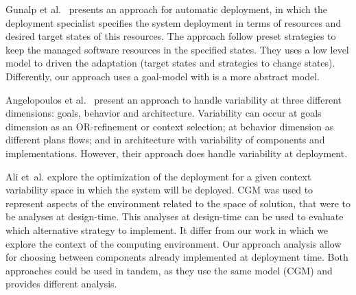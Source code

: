 Gunalp et al.~\citep{gunalp_rondo_2015} presents an approach for automatic deployment, in which the deployment specialist specifies the system deployment in terms of resources and desired target states of this resources. The approach follow preset strategies to keep the managed software resources in the specified states. They uses a low level model to driven the adaptation (target states and strategies to change states). Differently, our approach uses a goal-model with is a more abstract model.

Angelopoulos et al.~\cite{angelopoulos_capturing_2015} present an approach to handle  variability at three different dimensions: goals, behavior and architecture. Variability can occur at goals dimension as an OR-refinement or context selection; at behavior dimension as different plans flows; and in architecture with variability of components and implementations. However, their approach does handle variability at deployment.


Ali et~al.\cite{ali_requirements-driven_2014} explore the optimization of the deployment for a given context variability space in which the system will be deployed. CGM was used to represent aspects of the environment related to the space of solution, that were to be analyses at design-time. This analyses at design-time can be used to evaluate which alternative strategy to implement.
It differ from our work in which we explore the context of the computing environment. Our approach analysis allow for choosing between components already implemented at deployment time. Both approaches could be used in tandem, as they use the same model (CGM) and provides different analysis.



